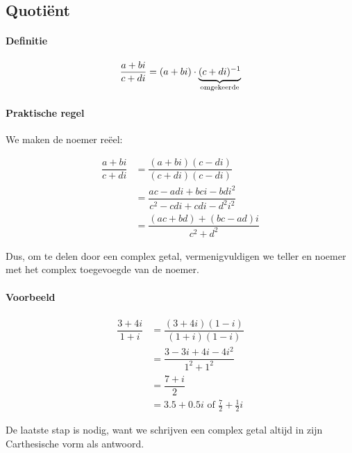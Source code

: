 \documentclass[12pt,twoside]{article}
\begin{document}
\subsection{Quotiënt}

\paragraph*{Definitie}
\begin{mdframed}
$$\dfrac{a+bi}{c+di} = (a+bi)\cdot\underbrace{(c+di)^{-1}}_{\mbox{\scriptsize omgekeerde}}$$
\end{mdframed}

\paragraph*{Praktische regel}

We maken de noemer reëel:

\begin{align*}
  \dfrac{a+bi}{c+di} &= \dfrac{(a+bi)(c-di)}{(c+di)(c-di)} \\
                     &= \dfrac{ac-adi + bci - bdi^2}{c^2 - cdi + cdi -d^2i^2}\\
                     &= \dfrac{(ac + bd) + (bc -ad)i}{c^2 + d^2}
\end{align*}

Dus, om te delen door een complex getal, vermenigvuldigen we teller en noemer met het complex toegevoegde van de noemer.

\paragraph*{Voorbeeld}
\begin{align*}
  \dfrac{3+4i}{1+i} &= \dfrac{(3+4i)(1-i)}{(1+i)(1-i)} \\
                    &= \dfrac{3-3i + 4i - 4i^2}{1^2 + 1^2}\\
                    &= \dfrac{7 + i}{2}\\
                    &= 3.5 + 0.5i \mbox{ of } \frac{7}{2} + \frac{1}{2}i
\end{align*}

De laatste stap is nodig, want we schrijven een complex getal altijd in zijn Carthesische vorm als antwoord.
\end{document}
